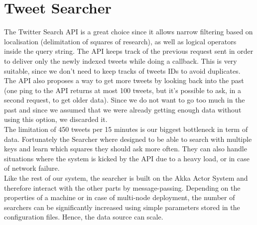 \section{Tweet Searcher}

The Twitter Search API is a great choice since it allows narrow filtering based on localisation (delimitation of squares of research), as well as logical operators inside the query string. The API keeps track of the previous request sent in order to deliver only the newly indexed tweets while doing a callback. This is very suitable, since we don't need to keep tracks of tweets IDs to avoid duplicates. \\

The API also proposes a way to get more tweets by looking back into the past (one ping to the API returns at most 100 tweets, but it's possible to ask, in a second request, to get older data). Since we do not want to go too much in the past and since we assumed that we were already getting enough data without using this option, we discarded it. \\

The limitation of 450 tweets per 15 minutes is our biggest bottleneck in term of data. Fortunately the Searcher where designed to be able to search with multiple keys and learn which squares they should ask more often. They can also handle situations where the system is kicked by the API due to a heavy load, or in case of network failure. \\

Like the rest of our system, the searcher is built on the Akka Actor System and therefore interact with the other parts by message-passing. Depending on the properties of a machine or in case of multi-node deployment, the number of searchers can be significantly increased using simple parameters stored in the configuration files. Hence, the data source can scale. \\